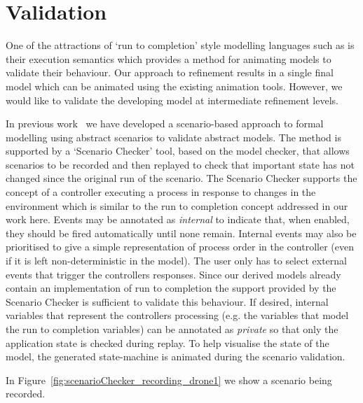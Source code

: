 

\section{Validation}
\label{sec:validation}

One of the attractions of `run to completion' style modelling languages such as \SCXML is their execution semantics which provides a method for animating models to validate their behaviour.
Our approach to \SCXML refinement results in a single \SCXML final model which can be animated using the existing \SCXML animation tools.
However, we would like to validate the developing \UMLB model at intermediate refinement levels. 

In previous work~\cite{snook20JSA} we have developed a scenario-based approach to formal modelling using abstract scenarios to validate abstract models.
The method is supported by a `Scenario Checker' tool, based on the \PROB model checker, that allows scenarios to be recorded and then replayed to check that important state has not changed since the original run of the scenario.
The Scenario Checker supports the concept of a controller executing a process in response to changes in the environment which is similar to the run to completion concept addressed in our work here.
Events may be annotated as \emph{internal} to indicate that, when enabled, they should be fired automatically until none remain.
Internal events may also be prioritised to give a simple representation of process order in the controller (even if it is left non-deterministic in the model).
The user only has to select external events that trigger the controllers responses.
Since our \SCXML derived models already contain an implementation of run to completion the support provided by the Scenario Checker is sufficient to validate this behaviour.
If desired, internal variables that represent the controllers processing (e.g. the variables that model the \SCXML run to completion variables) can be annotated as \emph{private} so that only the application state is checked during replay.
To help visualise the state of the model, the generated \UMLB state-machine is animated during the scenario validation.

In Figure~\ref{fig:scenarioChecker_recording_drone1} we show a scenario being recorded.



